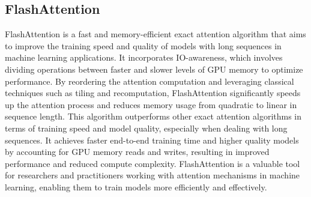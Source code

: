 
\subsection{FlashAttention}

FlashAttention is a fast and memory-efficient exact attention algorithm that aims to improve the training speed and
quality of models with long sequences in machine learning applications. It incorporates IO-awareness, which involves
dividing operations between faster and slower levels of GPU memory to optimize performance. By reordering the attention
computation and leveraging classical techniques such as tiling and recomputation, FlashAttention significantly speeds up
the attention process and reduces memory usage from quadratic to linear in sequence length. This algorithm outperforms
other exact attention algorithms in terms of training speed and model quality, especially when dealing with long
sequences. It achieves faster end-to-end training time and higher quality models by accounting for GPU memory reads and
writes, resulting in improved performance and reduced compute complexity. FlashAttention is a valuable tool for
researchers and practitioners working with attention mechanisms in machine learning, enabling them to train models more
efficiently and effectively.



%
%

